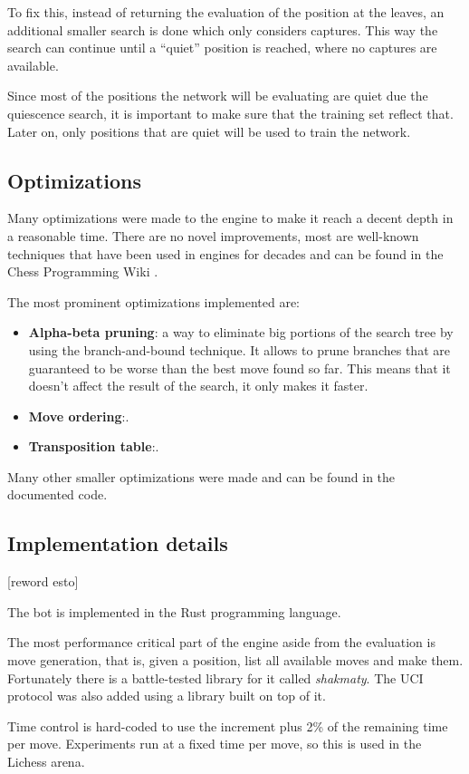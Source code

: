 To fix this, instead of returning the evaluation of the position at the leaves, an additional smaller search is done which only considers captures. This way the search can continue until a \enquote{quiet} position is reached, where no captures are available.

Since most of the positions the network will be evaluating are quiet due the quiescence search, it is important to make sure that the training set reflect that. Later on, only positions that are quiet will be used to train the network.

\subsection{Optimizations}

Many optimizations were made to the engine to make it reach a decent depth in a reasonable time. There are no novel improvements, most are well-known techniques that have been used in engines for decades and can be found in the Chess Programming Wiki \cite{cpw}.

The most prominent optimizations implemented are:

\begin{itemize}
\item \textbf{Alpha-beta pruning}: a way to eliminate big portions of the search tree by using the branch-and-bound technique. It allows to prune branches that are guaranteed to be worse than the best move found so far. This means that it doesn't affect the result of the search, it only makes it faster.
\item \textbf{Move ordering}:.
\item \textbf{Transposition table}:.
\end{itemize}

Many other smaller optimizations were made and can be found in the documented code.




\subsection{Implementation details}

[reword esto]

The bot is implemented in the Rust programming language.

The most performance critical part of the engine aside from the evaluation is move generation, that is, given a position, list all available moves and make them.
Fortunately there is a battle-tested library for it called \textit{shakmaty}. The UCI protocol was also added using a library built on top of it.

Time control is hard-coded to use the increment plus 2\% of the remaining time per move. Experiments run at a fixed time per move, so this is used in the Lichess arena.


